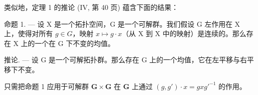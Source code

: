 类似地，定理 1 的推论 (IV, 第 40 页) 蕴含下面的结果：

命题 1. --- 设 X 是一个拓扑空间，G 是一个可解群。我们假设 G 左作用在 X 上，使得对所有 \(g \in G\)，映射 \(x \mapsto g \cdot x\)（从 X 到 X 中的映射）是连续的。那么存在 X 上的一个在 G 下不变的均值。

推论. --- 设 G 是一个可解拓扑群。那么存在 G 上的一个均值，它在左平移与右平移下不变。

只需把命题 1 应用于可解群 \(\mathbf{G} \times \mathbf{G}\) 在 \(\mathbf{G}\) 上通过 \((g, g') \cdot x = gxg'^{-1}\) 的作用。

